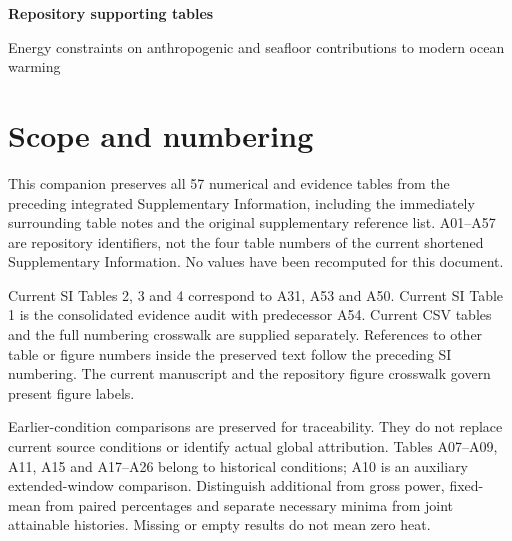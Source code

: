 \documentclass[11pt,a4paper]{article}
\begin{document}
{\Large\bfseries Repository supporting tables\par}
Energy constraints on anthropogenic and seafloor contributions to modern ocean warming\par
\section*{Scope and numbering}
This companion preserves all 57 numerical and evidence tables from the preceding integrated Supplementary Information, including the immediately surrounding table notes and the original supplementary reference list. A01--A57 are repository identifiers, not the four table numbers of the current shortened Supplementary Information. No values have been recomputed for this document.\par
Current SI Tables 2, 3 and 4 correspond to A31, A53 and A50. Current SI Table 1 is the consolidated evidence audit with predecessor A54. Current CSV tables and the full numbering crosswalk are supplied separately. References to other table or figure numbers inside the preserved text follow the preceding SI numbering. The current manuscript and the repository figure crosswalk govern present figure labels.\par
Earlier-condition comparisons are preserved for traceability. They do not replace current source conditions or identify actual global attribution. Tables A07--A09, A11, A15 and A17--A26 belong to historical conditions; A10 is an auxiliary extended-window comparison. Distinguish additional from gross power, fixed-mean from paired percentages and separate necessary minima from joint attainable histories. Missing or empty results do not mean zero heat.\par
\end{document}
